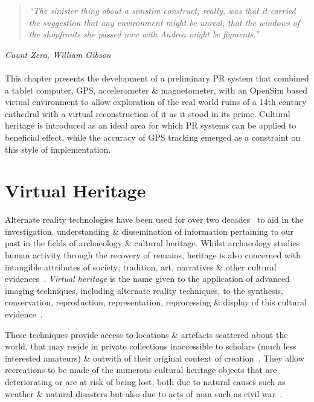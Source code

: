 \begin{quote}
	\textit{``The sinister thing about a simstim construct, really, was that it carried the suggestion that any environment might be unreal, that the windows of the shopfronts she passed now with Andrea might be figments.''}
\end{quote}
\hfill \textit{Count Zero, William Gibson}
\\
\\


This chapter presents the development of a preliminary PR system that combined a tablet computer, GPS, accelerometer \& magnetometer, with an OpenSim based virtual environment to allow exploration of the real world ruins of a 14th century cathedral with a virtual reconstruction of it as it stood in its prime. Cultural heritage is introduced as an ideal area for which PR systems can be applied to beneficial effect, while the accuracy of GPS tracking emerged as a constraint on this style of implementation.


\section{Virtual Heritage}

Alternate reality technologies have been used for over two decades~\cite{Roussou2002} to aid in the investigation, understanding \& dissemination of information pertaining to our past in the fields of archaeology \& cultural heritage. Whilst archaeology studies human activity through the recovery of remains, heritage is also concerned with intangible attributes of society; tradition, art, narratives \& other cultural evidences~\cite{Roussou2002}. \textit{Virtual heritage} is the name given to the application of advanced imaging techniques, including alternate reality techniques, to the synthesis, conservation, reproduction, representation, reprocessing \& display of this cultural evidence~\cite{roussou:photorealism}.

These techniques provide access to locations \& artefacts scattered about the world, that may reside in private collections inaccessible to scholars (much less interested amateurs) \& outwith of their original context of creation~\cite{griffin:recovering}. They allow recreations to be made of the numerous cultural heritage objects that are deteriorating or are at risk of being lost, both due to natural causes such as weather \& natural disasters but also due to acts of man such as civil war~\cite{Ikeuchi2003}.

